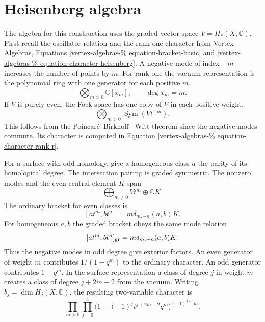 \section{Heisenberg algebra}
\label{section-heisenberg}

\noindent
The algebra for this construction uses the
graded vector space $V=H_*(X,\mathbb{C})$.
First recall the oscillator relation and
the rank-one character from Vertex Algebras,
Equations \ref{vertex-algebras-%
equation-bracket-basic} and
\ref{vertex-algebras-%
equation-character-heisenberg}.
A negative mode of index $-m$ increases the
number of points by $m$. For rank one the
vacuum representation is the polynomial ring
with one generator for each positive $m$.
\begin{equation}
\label{equation-symmetric-rank-1}
\bigotimes_{m>0}\mathbb{C}[x_m],
\qquad \deg x_m=m .
\end{equation}
If $V$ is purely even, the Fock space has
one copy of $V$ in each positive weight.
\begin{equation}
\label{equation-symmetric}
\bigotimes_{m>0}\operatorname{Sym}(Vt^{-m}).
\end{equation}
This follows from the Poincar\'e--Birkhoff--
Witt theorem since the negative modes
commute. Its character is computed in
Equation \ref{vertex-algebras-%
equation-character-rank-r}.

For a surface with odd homology, give a
homogeneous class $a$ the parity of its
homological degree. The intersection pairing
is graded symmetric. The nonzero modes and
the even central element $K$ span
\begin{equation}
\label{equation-super-heisenberg}
\bigoplus_{m\ne 0} Vt^m\oplus\mathbb{C}K .
\end{equation}
The ordinary bracket for even classes is
\begin{equation}
\label{equation-bracket-affine}
[at^m,bt^n]=m\delta_{m,-n}(a,b)K .
\end{equation}
For homogeneous $a,b$ the graded bracket
obeys the same mode relation
\begin{equation}
\label{equation-super-bracket}
[at^m,bt^n]_{\rm gr}
=m\delta_{m,-n}(a,b)K .
\end{equation}
Thus the negative modes in odd degree give
exterior factors. An even generator of
weight $m$ contributes $1/(1-q^m)$ to the
ordinary character. An odd generator
contributes $1+q^m$. In the surface
representation a class of degree $j$ in
weight $m$ creates a class of degree
$j+2m-2$ from the vacuum. Writing
$b_j=\dim H_j(X,\mathbb{C})$, the resulting
two-variable character is
\begin{equation}
\label{equation-character}
\prod_{m>0}\prod_{j=0}^4
\bigl(1-(-1)^jt^{j+2m-2}q^m\bigr)
^{(-1)^{j+1}b_j}.
\end{equation}


